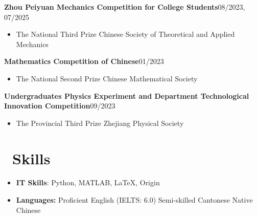 \documentclass[svgnames, legalpaper]{article}
\newcommand \itemdate [2]{\noindent {\large\enspace} \textbf{#1}\hfill #2}
\begin{document}
\itemdate{Zhou Peiyuan Mechanics Competition for College Students}
  {08/2023, 07/2025}
\begin{itemize}
  \item The National Third Prize \hfill Chinese Society of Theoretical and Applied Mechanics
\end{itemize}
\itemdate{Mathematics Competition of Chinese}{01/2023}
\begin{itemize}
  \item The National Second Prize \hfill Chinese Mathematical Society
\end{itemize}
\itemdate{Undergraduates Physics Experiment and Department
  Technological Innovation Competition}{09/2023}
\begin{itemize}
  \item The Provincial Third Prize \hfill Zhejiang Physical Society
\end{itemize}

\section*{~Skills}

\begin{itemize}
  \item \textbf{IT Skills}:
  \textsf{Python}, \textsf{MATLAB}, \LaTeX, \textsf{Origin}
  \item \textbf{Languages:}
  Proficient English (IELTS: 6.0)%
  \enspace \textbar \enspace
  Semi-skilled Cantonese%
  \enspace \textbar \enspace
  Native Chinese
\end{itemize}
\end{document}
